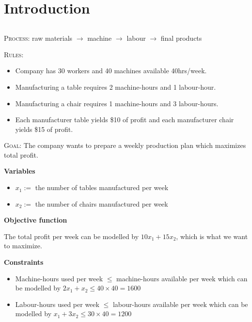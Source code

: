 \chapter{Introduction}
\begin{exbox}
    \begin{example}

        $ \; $

        \textsc{Process}: raw materials $\rightarrow$ machine $\rightarrow$ labour $\rightarrow$ final products

        \textsc{Rules}:
        \begin{itemize}
            \item Company has 30 workers and 40 machines available 40hrs/week.
            \item Manufacturing a table requires 2 machine-hours and 1 labour-hour.
            \item Manufacturing a chair requires 1 machine-hours and 3 labour-hours.
            \item Each manufacturer table yields \$10 of profit and each manufacturer chair yields \$15 of profit.
        \end{itemize}

        \textsc{Goal}: The company wants to prepare a weekly production plan which maximizes
        total profit.

        \textbf{Variables}
        \begin{itemize}
            \item $x_1:=$ the number of tables manufactured per week
            \item $x_2:=$ the number of chairs manufactured per week
        \end{itemize}

        \textbf{Objective function}

        The total profit per week can be modelled by $10x_1 + 15x_2$, which is what
        we want to maximize.

        \textbf{Constraints}
        \begin{itemize}
            \item Machine-hours used per week $\le$  machine-hours available per week which
                  can be modelled by $2x_1 + x_2 \leqslant  40 \times 40 = 1600$
            \item Labour-hours used per week $\le$ labour-hours available per week which can
                  be modelled by $x_1 + 3x_2 \leqslant 30 \times 40 = 1200$
        \end{itemize}


\end{example}
\end{exbox}
